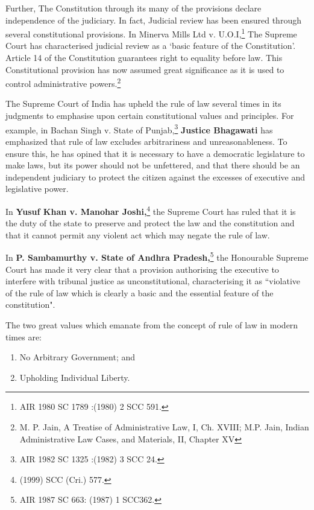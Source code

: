 \begin{multicols}{2}
\noi
Further, The Constitution through its many of the provisions declare independence of the
judiciary. In fact, Judicial review has been ensured through several constitutional provisions. In Minerva Mills Ltd v. U.O.I,\footnote{AIR 1980 SC 1789 :(1980) 2 SCC 591.}  The Supreme Court has characterised judicial review as a ‘basic feature of the Constitution’. Article 14 of the Constitution guarantees right to equality before law. This Constitutional provision has now assumed great significance as it is used to control administrative powers.\footnote{M. P. Jain, A Treatise of Administrative Law, I, Ch. XVIII; M.P. Jain, Indian Administrative Law Cases, and Materials, II, Chapter XV}

\noi
The Supreme Court of India has upheld the rule of law several times in its judgments to emphasise
upon certain constitutional values and principles. For example, in Bachan Singh v. State of
Punjab,\footnote{AIR 1982 SC 1325 :(1982) 3 SCC 24.} \textbf{Justice Bhagawati} has emphasized that rule of law excludes arbitrariness and unreasonableness. To ensure this, he has opined that it is necessary to have a democratic legislature to make laws, but its power should not be unfettered, and that there should be an independent judiciary to protect the citizen against the excesses of executive and legislative power.

\noi
In \textbf{Yusuf Khan v. Manohar Joshi,}\footnote{(1999) SCC (Cri.) 577.} the Supreme Court has ruled that it is the duty of the state to preserve and protect the law and the constitution and that it cannot permit any violent act which may negate the rule of law.

\noi
In \textbf{P. Sambamurthy v. State of Andhra Pradesh,}\footnote{AIR 1987 SC 663: (1987) 1 SCC362.} the Honourable Supreme Court has made it very clear that a provision authorising the executive to interfere with tribunal justice as
unconstitutional, characterising it as “violative of the rule of law which is clearly a basic and the
essential feature of the constitution".

\noi
The two great values which emanate from the concept of rule of law in modern times are:

\vspace{-.3cm}

\begin{enumerate}
\itemsep=0pt

\item No Arbitrary Government; and

\item Upholding Individual Liberty.
\end{enumerate}


\end{multicols}
